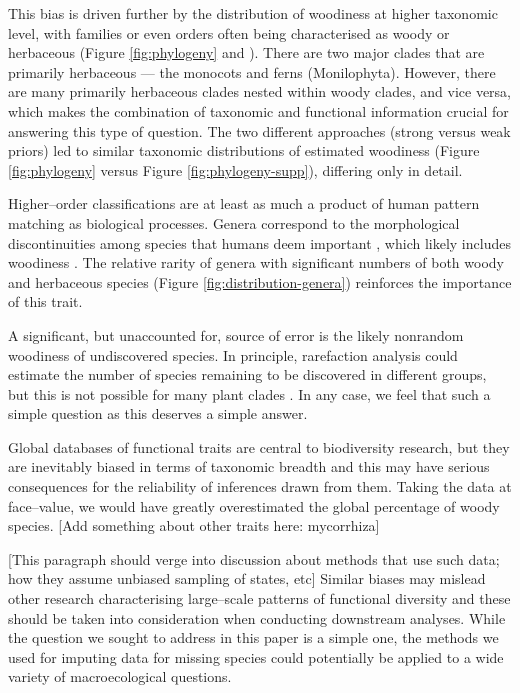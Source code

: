\documentclass[a4paper,12pt]{article}
\begin{document}
This bias is driven further by the distribution of woodiness at higher
taxonomic level, with families or even orders often being
characterised as woody or herbaceous (Figure \ref{fig:phylogeny} and
\citealt{sinnott1915evolution}).  There are two major clades that are
primarily herbaceous --- the monocots and ferns
(Monilophyta). However, there are many primarily herbaceous clades
nested within woody clades, and vice versa, which makes the
combination of taxonomic and functional information crucial for
answering this type of question.  The two different approaches (strong
versus weak priors) led to similar taxonomic distributions of
estimated woodiness (Figure \ref{fig:phylogeny} versus Figure
\ref{fig:phylogeny-supp}), differing only in detail.

Higher--order classifications are at least as much a product of human
pattern matching as biological processes.  Genera correspond to the
morphological discontinuities among species that humans deem important
\citep{scotland2004significance}, which likely includes woodiness
\citep[e.g.,][]{Hutchinson}.  The relative rarity of genera with
significant numbers of both woody and herbaceous species (Figure
\ref{fig:distribution-genera}) reinforces the importance of this
trait.

A significant, but unaccounted for, source of error is the likely
nonrandom woodiness of undiscovered species.  In principle,
rarefaction analysis could estimate the number of species remaining to
be discovered in different groups, but this is not possible for many
plant clades \citep{costello2011}.
%
In any case, we feel that such a simple question as this deserves a
simple answer.

Global databases of functional traits
\citep[e.g. TRY;][]{kattge2011try} are central to biodiversity
research, but they are inevitably biased in terms of taxonomic breadth
and this may have serious consequences for the reliability of
inferences drawn from them.
%
Taking the data at face--value, we would have greatly overestimated
the global percentage of woody species.  
%
[Add something about other traits here: mycorrhiza]

[This paragraph should verge into discussion about methods that use
such data; how they assume unbiased sampling of states, etc]
%
Similar biases may mislead other research characterising large--scale
patterns of functional diversity and these should be taken into
consideration when conducting downstream analyses.
%
%
While the question we sought to address in this paper is a simple one,
the methods we used for imputing data for missing species could
potentially be applied to a wide variety of macroecological questions.
\end{document}

